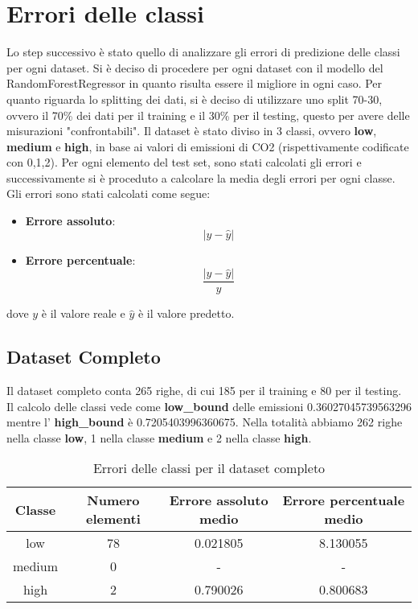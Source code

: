 \section{Errori delle classi}

Lo step successivo è stato quello di analizzare gli errori di predizione delle classi per ogni dataset.
Si è deciso di procedere per ogni dataset con il modello del RandomForestRegressor in quanto risulta essere il migliore in ogni caso.
Per quanto riguarda lo splitting dei dati, si è deciso di utilizzare uno split 70-30, ovvero il 70\% dei dati per il training e il 30\% per il testing, questo per avere delle misurazioni "confrontabili".
Il dataset è stato diviso in 3 classi, ovvero \textbf{low}, \textbf{medium} e \textbf{high}, in base ai valori di emissioni di CO2 (rispettivamente codificate con 0,1,2).
Per ogni elemento del test set, sono stati calcolati gli errori e successivamente si è proceduto a calcolare la media degli errori per ogni classe.
Gli errori sono stati calcolati come segue:
\begin{itemize}
    \item \textbf{Errore assoluto}:\begin{equation*}
        |y - \hat{y}|
         \end{equation*}
    \item \textbf{Errore percentuale}: \begin{equation*}
        \frac{|y - \hat{y}|}{y}
    \end{equation*}
\end{itemize}
dove $y$ è il valore reale e $\hat{y}$ è il valore predetto.


\subsection{Dataset Completo}

Il dataset completo conta 265 righe, di cui 185 per il training e 80 per il testing.
Il calcolo delle classi vede come \textbf{low\_bound} delle emissioni 0.36027045739563296 mentre l' \textbf{high\_bound} è 0.7205403996360675.
Nella totalità abbiamo 262 righe nella classe \textbf{low}, 1 nella classe \textbf{medium} e 2 nella classe \textbf{high}.


\begin{table}[H]
    \centering
    \begin{tabular}{|c|c|c|c|}
        \hline
        \textbf{Classe} &  \textbf{Numero elementi} & \textbf{Errore assoluto medio} & \textbf{Errore percentuale medio} \\ \hline
        low             & 78                & 0.021805                   & 8.130055            \\ \hline
        medium          & 0                & -                  & -            \\ \hline
        high            & 2                & 0.790026                   & 0.800683            \\ \hline
    \end{tabular}
    \caption{Errori delle classi per il dataset completo}
\end{table}

